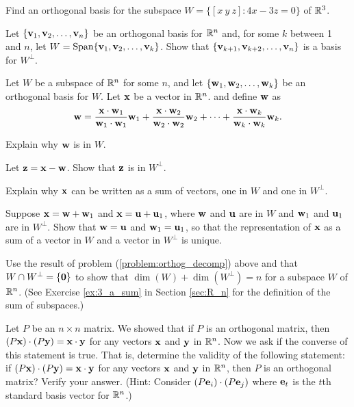 \label{sec:orthog_set_exer}
\be
\item Find an orthogonal basis for the subspace $W = \{ [x \ y \ z] : 4x-3z = 0\}$ of $\mathbb{R}^3$.

\item Let $\{\mathbf{v}_1, \mathbf{v}_2, \ldots, \mathbf{v}_n\}$ be an orthogonal basis for $\mathbb{R}^n$ and, for some $k$ between 1 and $n$, let $W = \text{Span}\{\mathbf{v}_1,\mathbf{v}_2, \ldots, \mathbf{v}_k\}$. Show that $\{\mathbf{v}_{k+1}, \mathbf{v}_{k+2}, \ldots, \mathbf{v}_n\}$ is a basis for $W^{\perp}$. 

\item \label{problem:orthog_decomp} Let $W$ be a subspace of $\mathbb{R}^n$ for some $n$, and let $\{\mathbf{w}_1, \mathbf{w}_2, \ldots, \mathbf{w}_k\}$ be an orthogonal basis for $W$. Let $\mathbf{x}$ be a vector in $\mathbb{R}^n$. and define $\mathbf{w}$ as 
\[\mathbf{w} = \frac{\mathbf{x} \cdot \mathbf{w}_1}{\mathbf{w}_1 \cdot \mathbf{w}_1} \mathbf{w}_1 + \frac{\mathbf{x} \cdot \mathbf{w}_2}{\mathbf{w}_2 \cdot \mathbf{w}_2} \mathbf{w}_2 + \cdots + \frac{\mathbf{x} \cdot \mathbf{w}_k}{\mathbf{w}_k \cdot \mathbf{w}_k} \mathbf{w}_k.\]
	\ba
	\item Explain why $\mathbf{w}$ is in $W$.
	\item Let $\mathbf{z} = \mathbf{x} - \mathbf{w}$. Show that $\mathbf{z}$ is in $W^{\perp}$. 

	\item Explain why $\mathbf{x}$ can be written as a sum of vectors, one in $W$ and one in $W^{\perp}$. 

	\item Suppose $\mathbf{x} = \mathbf{w}+\mathbf{w}_1$ and $\mathbf{x} = \mathbf{u}+\mathbf{u}_1$, where $\mathbf{w}$ and $\mathbf{u}$ are in $W$ and $\mathbf{w}_1$ and $\mathbf{u}_1$ are in $W^{\perp}$. Show that $\mathbf{w}=\mathbf{u}$ and $\mathbf{w}_1 = \mathbf{u}_1$, so that the representation of $\mathbf{x}$ as a sum of a vector in $W$ and a vector in $W^{\perp}$ is unique.

	\ea

\item Use the result of problem (\ref{problem:orthog_decomp}) above and that $W\cap W^\perp=\{\mathbf{0}\}$ to show that $\dim(W)+\dim(W^\perp)=n$ for a subspace $W$ of $\mathbb{R}^n$. (See Exercise \ref{ex:3_a_sum} in Section \ref{sec:R_n} for the definition of the sum of subspaces.)


\item Let $P$ be an $n \times n$ matrix. We showed that if $P$ is an orthogonal matrix, then $(P\mathbf{x}) \cdot (P\mathbf{y}) = \mathbf{x} \cdot \mathbf{y}$ for any vectors $\mathbf{x}$ and $\mathbf{y}$ in $\mathbb{R}^n$. Now we ask if the converse of this statement is true. That is, determine the validity of the following statement: if $(P\mathbf{x}) \cdot (P\mathbf{y}) = \mathbf{x} \cdot \mathbf{y}$ for any vectors $\mathbf{x}$ and $\mathbf{y}$ in $\mathbb{R}^n$, then $P$ is an orthogonal matrix? Verify your answer. (Hint: Consider $(P \mathbf{e}_i) \cdot (P \mathbf{e}_j)$ where $\mathbf{e}_t$ is the $t$th standard basis vector for $\mathbb{R}^n$.) 

